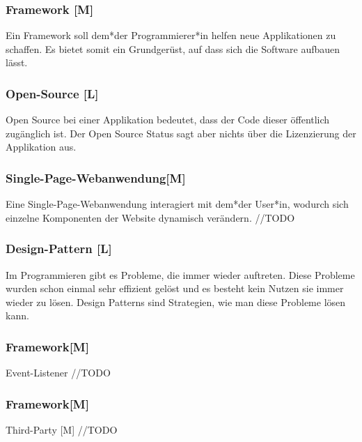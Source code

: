 \subsubsection{Framework [M]}

Ein Framework soll dem*der Programmierer*in helfen neue Applikationen zu schaffen. Es bietet somit ein Grundgerüst, auf dass sich die Software aufbauen lässt.  

\subsubsection{Open-Source [L]}
Open Source bei einer Applikation bedeutet, dass der Code dieser öffentlich zugänglich ist. Der Open Source Status sagt aber nichts über die Lizenzierung der Applikation aus. 

\subsubsection{Single-Page-Webanwendung[M]}
Eine Single-Page-Webanwendung interagiert mit dem*der User*in, wodurch sich einzelne Komponenten der Website dynamisch verändern. //TODO

\subsubsection{Design-Pattern [L]}
Im Programmieren gibt es Probleme, die immer wieder auftreten. Diese Probleme wurden schon einmal sehr effizient gelöst und es besteht kein Nutzen sie immer wieder zu lösen. Design Patterns sind Strategien, wie man diese Probleme lösen kann. 

\subsubsection{Framework[M]}
Event-Listener
//TODO

\subsubsection{Framework[M]}
Third-Party [M]
//TODO
